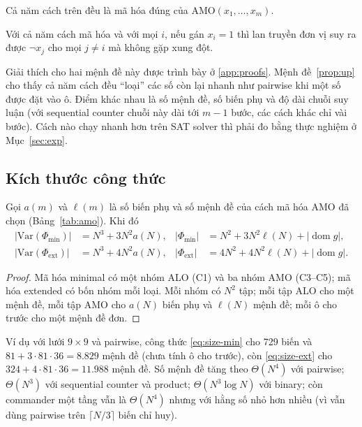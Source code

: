 \documentclass[a4paper,fleqn]{cas-sc}
\newcommand{\AMO}{\mathrm{AMO}}
\newcommand{\dom}{\operatorname{dom}}
\begin{document}
\begin{proposition}\label{prop:amo}
Cả năm cách trên đều là mã hóa đúng của $\AMO(x_1,\dots,x_m)$.
\end{proposition}

\begin{proposition}\label{prop:up}
Với cả năm cách mã hóa và với mọi $i$, nếu gán $x_i=1$ thì lan truyền đơn vị suy ra được $\neg x_j$ cho mọi $j\neq i$ mà không gặp xung đột.
\end{proposition}

Giải thích cho hai mệnh đề này được trình bày ở \ref{app:proofs}. Mệnh đề~\ref{prop:up} cho thấy cả năm cách đều ``loại'' các số còn lại nhanh như pairwise khi một số được đặt vào ô. Điểm khác nhau là số mệnh đề, số biến phụ và độ dài chuỗi suy luận (với sequential counter chuỗi này dài tới $m-1$ bước, các cách khác chỉ vài bước). Cách nào chạy nhanh hơn trên SAT solver thì phải đo bằng thực nghiệm ở Mục~\ref{sec:exp}.

\subsection{Kích thước công thức}\label{sec:size}

\begin{proposition}\label{prop:size}
Gọi $a(m)$ và $\ell(m)$ là số biến phụ và số mệnh đề của cách mã hóa AMO đã chọn (Bảng~\ref{tab:amo}). Khi đó
\begin{align}
|\mathrm{Var}(\Phi_{\min})| &= N^3+3N^2a(N), & |\Phi_{\min}| &= N^2+3N^2\ell(N)+|\dom g|, \label{eq:size-min}\\
|\mathrm{Var}(\Phi_{\mathrm{ext}})| &= N^3+4N^2a(N), & |\Phi_{\mathrm{ext}}| &= 4N^2+4N^2\ell(N)+|\dom g|. \label{eq:size-ext}
\end{align}
\end{proposition}

\begin{proof}
Mã hóa minimal có một nhóm ALO (C1) và ba nhóm AMO (C3--C5); mã hóa extended có bốn nhóm mỗi loại. Mỗi nhóm có $N^2$ tập; mỗi tập ALO cho một mệnh đề, mỗi tập AMO cho $a(N)$ biến phụ và $\ell(N)$ mệnh đề; mỗi ô cho trước cho một mệnh đề đơn.
\end{proof}

Ví dụ với lưới $9\times9$ và pairwise, công thức \eqref{eq:size-min} cho 729 biến và $81+3\cdot81\cdot36=8.829$ mệnh đề (chưa tính ô cho trước), còn \eqref{eq:size-ext} cho $324+4\cdot81\cdot36=11.988$ mệnh đề. Số mệnh đề tăng theo $\Theta(N^4)$ với pairwise; $\Theta(N^3)$ với sequential counter và product; $\Theta(N^3\log N)$ với binary; còn commander một tầng vẫn là $\Theta(N^4)$ nhưng với hằng số nhỏ hơn nhiều (vì vẫn dùng pairwise trên $\lceil N/3\rceil$ biến chỉ huy).
\end{document}
